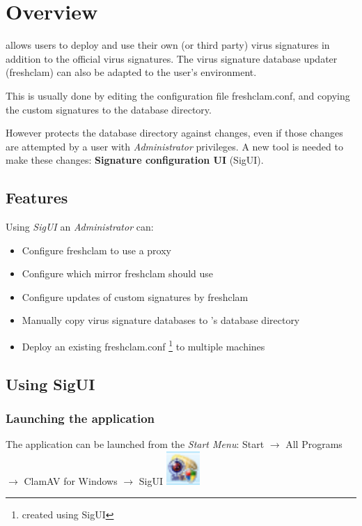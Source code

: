 \chapter{Overview}

\ClamAV allows users to deploy and use their own (or third party) virus signatures in
addition to the official virus signatures.
The virus signature database updater (\gls{freshclam}) can also be adapted to the
user's environment.

This is usually done by editing the configuration file \gls{freshclam.conf}, and copying the custom signatures to the database
directory.

However \CW protects the database directory against changes, even if those changes are attempted by a user with \emph{Administrator} privileges. 
A new tool is needed to make these changes: \textbf{Signature configuration UI} (SigUI).

\section{Features}
Using \emph{SigUI} an \emph{Administrator} can:
\begin{itemize}
\item Configure \gls{freshclam} to use a proxy
\item Configure which mirror \gls{freshclam} should use
\item Configure updates of custom signatures by \gls{freshclam}
\item Manually copy virus signature databases to \ClamAV's database directory
\item Deploy an existing \gls{freshclam.conf} \footnote{created using SigUI} to multiple machines
\end{itemize}

\section{Using SigUI}
\subsection{Launching the application}

The application can be launched from the \emph{Start Menu}:
Start $\to$ All Programs $\to$ ClamAV for Windows $\to$ SigUI \includegraphics[scale=0.5]{sigui_menu.png}

